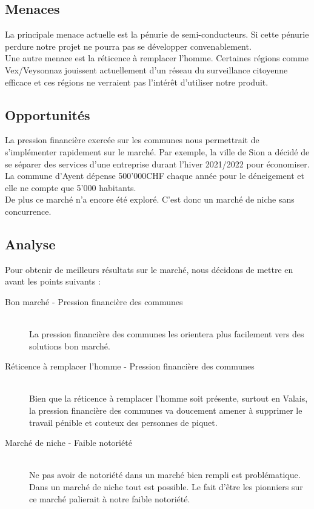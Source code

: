 \subsection{Menaces}
La principale menace actuelle est la pénurie de semi-conducteurs. Si cette pénurie perdure
notre projet ne pourra pas se développer convenablement.\\
Une autre menace est la réticence à remplacer l'homme. Certaines régions comme Vex/Veysonnaz
jouissent actuellement d'un réseau du surveillance citoyenne efficace et ces régions
ne verraient pas l'intérêt d'utiliser notre produit.

\subsection{Opportunités}
La pression financière exercée sur les communes nous permettrait de s'implémenter rapidement
sur le marché. Par exemple, la ville de Sion a décidé de se séparer des services d'une entreprise
durant l'hiver 2021/2022 pour économiser. La commune d'Ayent dépense 500'000CHF chaque année pour
le déneigement et elle ne compte que 5'000 habitants.\\
De plus ce marché n'a encore été exploré. C'est donc un marché de niche sans concurrence.

\subsection{Analyse}
Pour obtenir de meilleurs résultats sur le marché, nous décidons de mettre en avant les points suivants :
\begin{description}
    \item[Bon marché - Pression financière des communes] \hfill \\
    La pression financière des communes les orientera plus facilement vers des solutions
    bon marché. 
    \item[Réticence à remplacer l'homme - Pression financière des communes] \hfill \\
    Bien que la réticence à remplacer l'homme soit présente, surtout en Valais, la pression
    financière des communes va doucement amener à supprimer le travail pénible et couteux des personnes de piquet.
    \item[Marché de niche - Faible notoriété] \hfill \\ 
    Ne pas avoir de notoriété dans un marché bien rempli est problématique. Dans un marché de niche
    tout est possible. Le fait d'être les pionniers sur ce marché palierait à notre faible notoriété.
\end{description}

